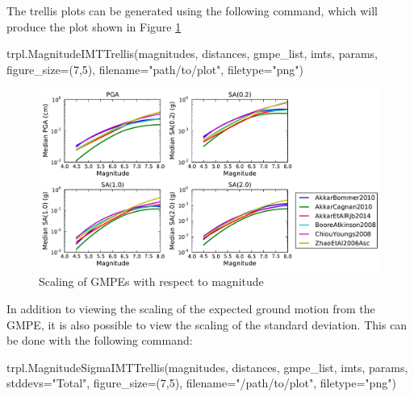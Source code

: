 The trellis plots can be generated using the following command, which will produce the plot shown in Figure \ref{fig:magnitude_trellis_simple}

\begin{python}[frame=single]
trpl.MagnitudeIMTTrellis(magnitudes, 
                         distances,
                         gmpe_list,
                         imts,
                         params,
                         figure_size=(7,5),
                         filename="path/to/plot", 
                         filetype="png")

\end{python}

\begin{figure}[htb]
	\centering
		\includegraphics[width=\textwidth]{./figures/trellis/magnitude_imt_trellis_simple.pdf}
	\caption{Scaling of GMPEs with respect to magnitude}
	\label{fig:magnitude_trellis_simple}
\end{figure}

In addition to viewing the scaling of the expected ground motion from the GMPE, it is also possible to view the scaling of the standard deviation. This can be done with the following command:

\begin{python}
trpl.MagnitudeSigmaIMTTrellis(magnitudes,
                              distances,
                              gmpe_list,
                              imts,
                              params, 
                              stddevs="Total",
                              figure_size=(7,5),
                              filename="/path/to/plot",
                              filetype="png")
\end{python}

